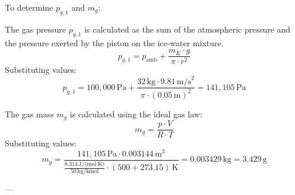 To determine \( p_{g,1} \) and \( m_g \):  

The gas pressure \( p_{g,1} \) is calculated as the sum of the atmospheric pressure and the pressure exerted by the piston on the ice-water mixture.  
\[
p_{g,1} = p_{\text{amb}} + \frac{m_K \cdot g}{\pi \cdot r^2}
\]  
Substituting values:  
\[
p_{g,1} = 100{,}000 \, \text{Pa} + \frac{32 \, \text{kg} \cdot 9.81 \, \text{m/s}^2}{\pi \cdot (0.05 \, \text{m})^2} = 141{,}105 \, \text{Pa}
\]  

The gas mass \( m_g \) is calculated using the ideal gas law:  
\[
m_g = \frac{p \cdot V}{R \cdot T}
\]  
Substituting values:  
\[
m_g = \frac{141{,}105 \, \text{Pa} \cdot 0.003144 \, \text{m}^3}{\frac{8.314 \, \text{J/(mol·K)}}{50 \, \text{kg/kmol}} \cdot (500 + 273.15) \, \text{K}} = 0.003429 \, \text{kg} = 3.429 \, \text{g}
\]  

---
